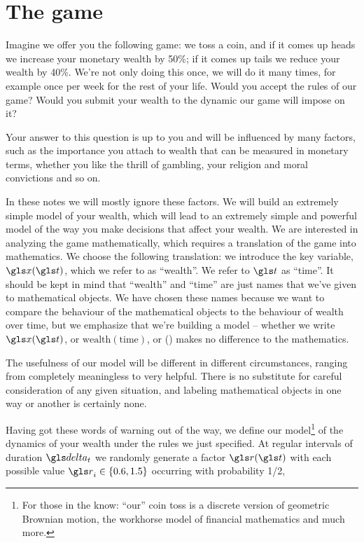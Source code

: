 \section{The game}
Imagine we offer you the following game: we toss a coin, and if it comes 
up heads we increase your monetary wealth by 50\%; if 
it comes up tails we reduce your wealth by 40\%. We're not only 
doing this once, we will do it many times, for example 
once per week for the rest of your life. Would you accept 
the rules of our game? Would you submit your wealth to 
the dynamic our game will impose on it?

Your answer to this question is up to you and will be 
influenced by many factors, such as the importance 
you attach to wealth that can be measured in monetary 
terms, whether you like the thrill of gambling, your 
religion and moral convictions and so on.

In these notes we will mostly ignore these factors.
We will build an extremely simple model of your 
wealth, which will lead to an extremely simple and 
powerful model of the way you make decisions that affect 
your wealth. We are interested in analyzing the 
game mathematically, which requires a translation 
of the game into mathematics. We choose the 
following translation: we introduce the key 
variable, $\x(\t)$, which we refer to as ``wealth''. 
We refer to $\t$ as ``time''. It should be kept in mind that
``wealth'' and ``time'' are just names that we've given to 
mathematical objects. We have chosen these names because
we want to compare the behaviour of the mathematical
objects to the behaviour of wealth over time, but
we emphasize that we're building a model -- whether we write $\x(\t)$, 
or $\text{wealth}(\text{time})$, or \smiley(\lightning) makes no difference to the mathematics. 

The usefulness of our model will be different in different circumstances, 
ranging from completely meaningless to very helpful. There is no 
substitute for careful consideration of any given situation, and
labeling mathematical objects in one way or another is certainly none.

Having got these words of warning out of the way, we define our 
model\footnote{For those in the know: ``our'' coin toss is a discrete version of geometric Brownian motion, the workhorse model of financial mathematics and much more.} of the dynamics of your wealth under the rules we just specified. 
At regular intervals of duration $\dt$ we randomly generate a 
factor $\gr(\t)$ with each possible value
$\gr_i\in \{0.6, 1.5\}$ occurring with probability 1/2, 

